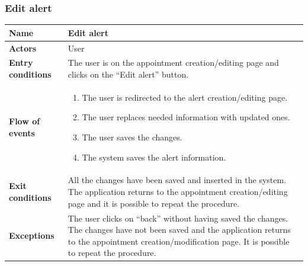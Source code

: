 \subsubsection{Edit alert}
\begin{table}[!h]
	\centering
	{\renewcommand{\arraystretch}{2}%
		\begin{tabular}{|l|p{12cm}|}
			\hline
			\textbf{Name} 				& \textbf{Edit alert} \\ \hline
			\textbf{Actors} 			& User \\ \hline
			\textbf{Entry conditions} 	& The user is on the appointment creation/editing page and clicks on the “Edit alert” button. \\ \hline
			\textbf{Flow of events}		& \begin{minipage}[t]{0.75\textwidth}
				\begin{enumerate}
					\item The user is redirected to the alert creation/editing page.
					\item The user replaces needed information with updated ones. 
					\item The user saves the changes.
					\item The system saves the alert information.
				\end{enumerate}
			\end{minipage}	\\ \hline
			\textbf{Exit conditions}	& All the changes have been saved and inserted in the system. The application returns to the appointment creation/editing page and it is possible to repeat the procedure.  \\ \hline
			\textbf{Exceptions}			& The user clicks on “back” without having saved the changes. The changes have not been saved and the application returns to the appointment creation/modification page. It is possible to repeat the procedure.  \\ \hline
	\end{tabular}}
\end{table}
\clearpage

